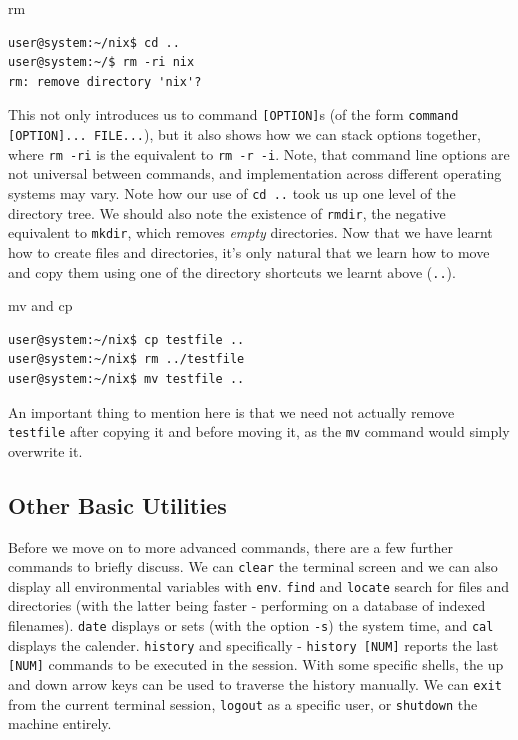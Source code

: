 \documentclass[11pt]{article}
\begin{document}
\begin{listing}[H]
\caption{rm}\vspace{-0.1in}
\begin{verbatim}
user@system:~/nix$ cd ..
user@system:~/$ rm -ri nix
rm: remove directory 'nix'?
\end{verbatim}
\end{listing}

This not only introduces us to command \texttt{[OPTION]}s (of the form \texttt{command [OPTION]... FILE...}), but it also shows how we can stack options together, where \texttt{rm -ri} is the equivalent to \texttt{rm -r -i}. Note, that command line options are not universal between commands, and implementation across different operating systems may vary. Note how our use of \texttt{cd ..} took us up one level of the directory tree. We should also note the existence of \texttt{rmdir}, the negative equivalent to \texttt{mkdir}, which removes \emph{empty} directories. Now that we have learnt how to create files and directories, it's only natural that we learn how to move and copy them using one of the directory shortcuts we learnt above (\texttt{..}).\\

\begin{listing}[H]
\caption{mv and cp}\vspace{-0.1in}
\begin{verbatim}
user@system:~/nix$ cp testfile ..
user@system:~/nix$ rm ../testfile
user@system:~/nix$ mv testfile ..
\end{verbatim}
\end{listing}

An important thing to mention here is that we need not actually remove \texttt{testfile} after copying it and before moving it, as the \texttt{mv} command would simply overwrite it.

\subsection{Other Basic Utilities}

Before we move on to more advanced commands, there are a few further commands to briefly discuss. We can \texttt{clear} the terminal screen and we can also display all environmental variables with \texttt{env}. \texttt{find} and \texttt{locate} search for files and directories (with the latter being faster - performing on a database of indexed filenames). \texttt{date} displays or sets (with the option \texttt{-s}) the system time, and \texttt{cal} displays the calender. \texttt{history} and specifically - \texttt{history [NUM]} reports the last \texttt{[NUM]} commands to be executed in the session. With some specific shells, the up and down arrow keys can be used to traverse the history manually. We can \texttt{exit} from the current terminal session, \texttt{logout} as a specific user, or \texttt{shutdown} the machine entirely.
\end{document}
